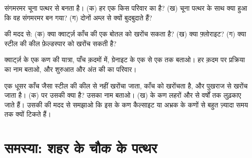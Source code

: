 \begin{exercise}[$\star\star$]\label{exo:g6:rocks-and-minerals:9}
संगमरमर चूना पत्थर से बनता है। (क) हर एक किस परिवार का है?
(ख) चूना पत्थर के साथ क्या हुआ कि वह संगमरमर बन गया? (ग) दोनों अम्ल से
क्यों बुदबुदाते हैं?
\end{exercise}

\begin{exercise}[$\star\star$]\label{exo:g6:rocks-and-minerals:10}
 की मदद से: (क) क्या क्वार्ट्ज़ काँच की एक बोतल को खरोंच सकता है? (ख) क्या
फ़्लोराइट? (ग) क्या स्टील की कील फ़ेल्डस्पार को खरोंच सकती है?
\end{exercise}

\begin{exercise}[$\star\star\star$]\label{exo:g6:rocks-and-minerals:11}
क्वार्ट्ज़ के एक कण की यात्रा, पाँच क़दमों में, ग्रेनाइट के एक  से एक  तक बताओ। हर क़दम पर प्रक्रिया का नाम बताओ, और शुरुआत और अंत की  का
परिवार।
\end{exercise}

\begin{exercise}[$\star\star\star$]\label{exo:g6:rocks-and-minerals:12}
एक धूसर काँच जैसा  स्टील की कील से नहीं खरोंचा जाता, काँच को खरोंचता है,
और पुखराज से खरोंच जाता है। (क)  पर उसकी  क्या है?
उसका नाम बताओ। (ख)  के कण लहरों और  से वर्षों तक लुढ़काए जाते हैं।
उसकी  की मदद से समझाओ कि इस  के कण कैल्साइट या अभ्रक के
कणों से बहुत ज़्यादा समय तक क्यों टिकते हैं।
\end{exercise}

\section{समस्या: शहर के चौक के पत्थर}

